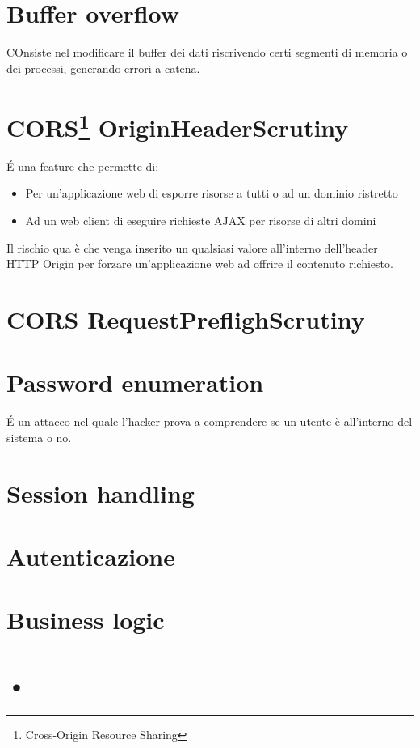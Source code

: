 \documentclass[11pt,a4paper]{book}
\begin{document}
\section{Buffer overflow}
COnsiste nel modificare il buffer dei dati riscrivendo certi segmenti di memoria o dei processi, generando errori a catena.

\section{CORS\footnote{Cross-Origin Resource Sharing} OriginHeaderScrutiny}
É una feature che permette di:
\begin{itemize}
	\item Per un'applicazione web di esporre risorse a tutti o ad un dominio ristretto
	\item Ad un web client di eseguire richieste AJAX per risorse di altri domini
\end{itemize}

Il rischio qua è che venga inserito un qualsiasi valore all'interno dell'header HTTP Origin per forzare un'applicazione web ad offrire il contenuto richiesto. 

\section{CORS RequestPreflighScrutiny}


\section{Password enumeration}
É un attacco nel quale l'hacker prova a comprendere se un utente è all'interno del sistema o no.

\section{Session handling}
\section{Autenticazione}
\section{Business logic}

\section{•}
\end{document}
